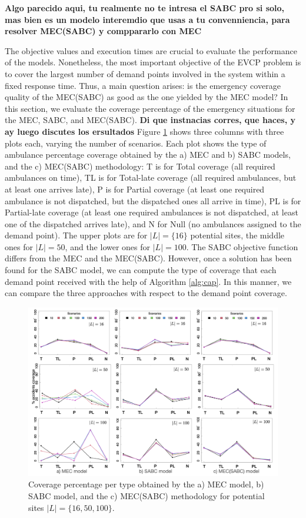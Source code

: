 \textbf{Algo parecido aqui, tu realmente no te intresa el SABC pro si solo, mas bien es un modelo interemdio que usas a tu convenniencia, para resolver MEC(SABC) y comppararlo con MEC}

 The objective values and execution times are crucial to evaluate the performance of the models. Nonetheless, the most important objective of the EVCP problem is to cover the largest number of demand points involved in the system within a fixed response time. Thus, a main question arises: is the emergency coverage quality of the MEC(SABC) as good as the one yielded by the MEC model? In this section, we evaluate the coverage percentage of the emergency situations for the MEC, SABC, and MEC(SABC).%
\textbf{Di que instnacias corres, que haces, y ay luego discutes los ersultados}
Figure \ref{fig:Coverage} shows three columns with three plots each, varying the number of scenarios. Each plot shows the type of ambulance percentage coverage obtained by the a) MEC and b) SABC models, and the c) MEC(SABC) methodology: T is for Total coverage (all required ambulances on time), TL is for Total-late coverage (all required ambulances, but at least one arrives late), P is for Partial coverage (at least one required ambulance is not dispatched, but the dispatched ones all arrive in time), PL is for Partial-late coverage (at least one required ambulances is not dispatched, at least one of the dispatched arrives late), and N for Null (no ambulances assigned to the demand point). The upper plots are for  $|L|=\{16\}$ potential sites, the middle ones for $|L|=50$, and the lower ones for $|L|=100$.
The SABC objective function differs from the MEC and the MEC(SABC). However, once a solution has been found for the SABC model, we can compute the type of coverage that each demand point received with the help of Algorithm \ref{alg:cap}. In this manner, we can compare the three approaches with respect to the demand point coverage.  

\begin{figure}
    \centering
    \includegraphics[width=1\linewidth]{figures/CoverageTodos.png}
    \caption{Coverage percentage per type obtained by the a) MEC model, b) SABC model, and the c) MEC(SABC) methodology for potential sites $|L|=\{16,50,100\}$.}
    \label{fig:Coverage}
\end{figure}

